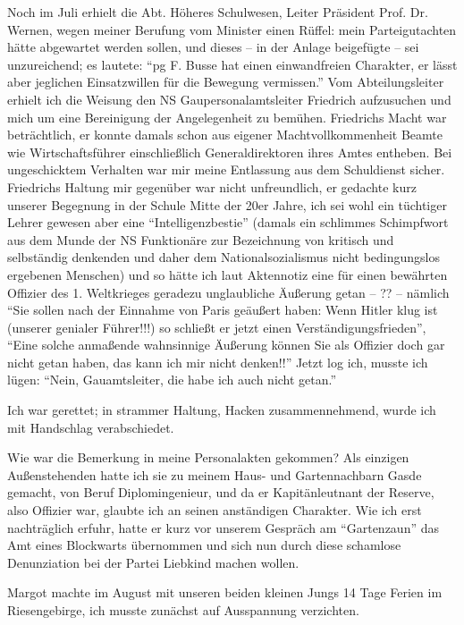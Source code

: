 Noch im Juli erhielt die Abt. Höheres Schulwesen, Leiter Präsident Prof. Dr. Wernen, wegen meiner Berufung vom Minister einen Rüffel: mein Parteigutachten hätte abgewartet werden sollen, und dieses -- in der Anlage beigefügte -- sei  unzureichend; es lautete: \enquote{\ac{pg} F. Busse hat einen einwandfreien Charakter, er lässt aber jeglichen Einsatzwillen für die Bewegung vermissen.} Vom Abteilungsleiter erhielt ich die Weisung den NS Gaupersonalamtsleiter Friedrich aufzusuchen und mich um eine Bereinigung der Angelegenheit zu bemühen. Friedrichs Macht war beträchtlich, er konnte damals schon aus eigener Machtvollkommenheit  Beamte wie Wirtschaftsführer einschließlich Generaldirektoren ihres Amtes entheben. Bei ungeschicktem Verhalten war mir meine Entlassung aus dem Schuldienst sicher. Friedrichs Haltung mir gegenüber war nicht unfreundlich, er gedachte kurz unserer Begegnung in der Schule Mitte der 20er Jahre, ich sei wohl ein tüchtiger Lehrer gewesen aber eine \enquote{Intelligenzbestie} (damals ein schlimmes Schimpfwort aus dem Munde der NS Funktionäre zur Bezeichnung von kritisch und selbständig denkenden und daher dem Nationalsozialismus nicht bedingungslos ergebenen Menschen) und so hätte ich laut Aktennotiz eine für einen bewährten Offizier des 1. Weltkrieges geradezu unglaubliche Äußerung getan -- ?? -- nämlich \enquote{Sie sollen nach der Einnahme von Paris  geäußert haben: Wenn Hitler klug ist (unserer genialer Führer!!!) so schließt er jetzt einen Verständigungsfrieden}, \enquote{Eine solche anmaßende wahnsinnige Äußerung können Sie als Offizier doch gar nicht getan haben, das kann ich mir nicht denken!!} Jetzt log ich, musste ich lügen: \enquote{Nein, Gauamtsleiter, die habe ich auch nicht getan.}

Ich war gerettet; in strammer Haltung, Hacken zusammennehmend, wurde ich mit Handschlag verabschiedet.

 Wie war die Bemerkung in meine Personalakten gekommen? Als einzigen Außenstehenden hatte ich sie zu meinem Haus- und Gartennachbarn Gasde gemacht, von Beruf Diplomingenieur, und da er Kapitänleutnant der Reserve, also Offizier war, glaubte ich an seinen anständigen Charakter. Wie ich erst nachträglich erfuhr, hatte er kurz vor unserem Gespräch am \enquote{Gartenzaun} das Amt eines Blockwarts übernommen und sich nun durch diese schamlose Denunziation bei der Partei Liebkind machen wollen.

Margot machte im August mit unseren beiden kleinen Jungs 14 Tage Ferien im Riesengebirge, ich musste zunächst auf Ausspannung verzichten.

